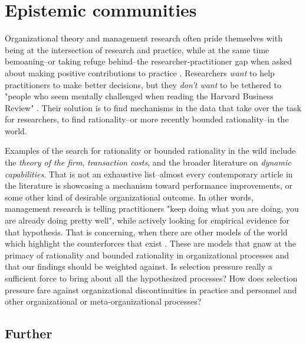
\section*{Epistemic communities}

Organizational theory and management research often pride themselves with being at the intersection of research and practice, while at the same time bemoaning--or taking refuge behind--the researcher-practitioner gap when asked about making positive contributions to practice \citep{Kieser2015}. Researchers \textit{want} to help practitioners to make better decisions, but they \textit{don't want} to be tethered to "people who seem mentally challenged when reading the Harvard Business Review" \citep[p. 823]{McKelvey2006}. Their solution is to find mechanisms in the data that take over the task for researchers, to find rationality--or more recently bounded rationality--in the world.

Examples of the search for rationality or bounded rationality in the wild include the \textit{theory of the firm}, \textit{transaction costs}, and the broader literature on \textit{dynamic capabilities}. That is not an exhaustive list--almost every contemporary article in the literature is showcasing a mechanism toward performance improvements, or some other kind of desirable organizational outcome. In other words, management research is telling practitioners "keep doing what you are doing, you are already doing pretty well", while actively looking for empirical evidence for that hypothesis. That is concerning, when there are other models of the world which highlight the counterforces that exist  \citep{Eisenhardt1992}. These are models that gnaw at the primacy of rationality and bounded rationality in organizational processes and that our findings should be weighted against.
Is selection pressure really a sufficient force to bring about all the hypothesized processes? How does selection pressure fare against organizational discontinuities in practice and personnel and other organizational or meta-organizational processes?

\subsection*{Further}

